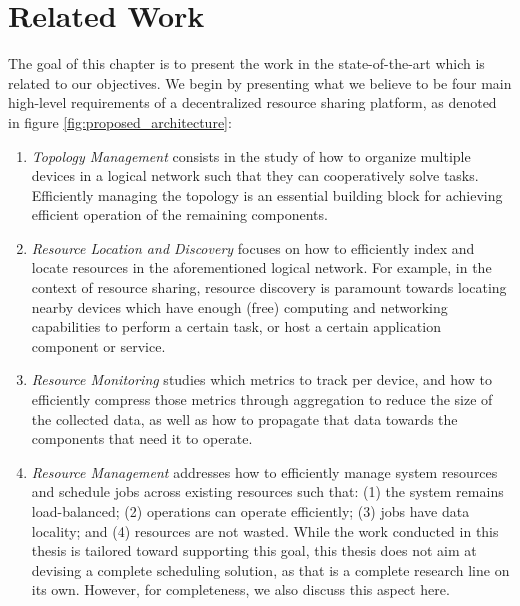 \chapter{Related Work}
\label{cha:related_work}

The goal of this chapter is to present the work in the state-of-the-art which is related to our objectives. We begin by presenting what we believe to be four main high-level requirements of a decentralized resource sharing platform, as denoted in figure \ref{fig:proposed_architecture}:

\begin{enumerate}

    \item \textit{Topology Management} consists in the study of how to organize multiple devices in a logical network such that they can cooperatively solve tasks. Efficiently managing the topology is an essential building block for achieving efficient operation of the remaining components.

    \item \textit{Resource Location and Discovery} focuses on how to efficiently index and locate resources in the aforementioned logical network. For example, in the context of resource sharing, resource discovery is paramount towards locating nearby devices which have enough (free) computing and networking capabilities to perform a certain task, or host a certain application component or service.

    \item \textit{Resource Monitoring} studies which metrics to track per device, and how to efficiently compress those metrics through aggregation to reduce the size of the collected data, as well as how to propagate that data towards the components that need it to operate.

    \item \textit{Resource Management} addresses how to efficiently manage system resources and schedule jobs across existing resources such that: (1) the system remains load-balanced; (2) operations can operate efficiently; (3) jobs have data locality; and (4) resources are not wasted. While the work conducted in this thesis is tailored toward supporting this goal, this thesis does not aim at devising a complete scheduling solution, as that is a complete research line on its own. However, for completeness, we also discuss this aspect here.

\end{enumerate}

